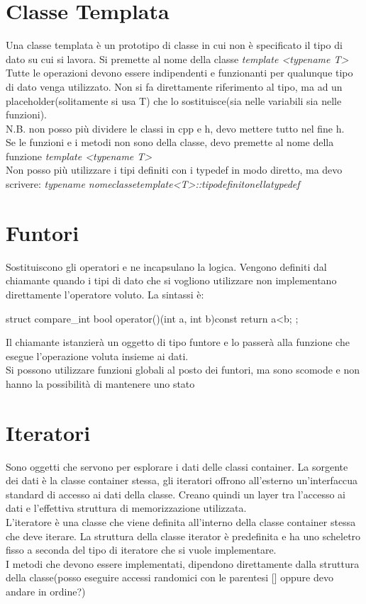 \section{Classe Templata}
Una classe templata è un prototipo di classe in cui non è specificato il tipo di dato su cui si lavora. Si premette al nome della classe \textit{template <typename T>}\\
Tutte le operazioni devono essere indipendenti e funzionanti per qualunque tipo di dato venga utilizzato. Non si fa direttamente riferimento al tipo, ma ad un placeholder(solitamente si usa T) che lo sostituisce(sia nelle variabili sia nelle funzioni).\\
N.B. non posso più dividere le classi in cpp e h, devo mettere tutto nel fine h.\\
Se le funzioni e i metodi non sono della classe, devo premette al nome della funzione \textit{template <typename T>}\\
Non posso più utilizzare i tipi definiti con i typedef in modo diretto, ma devo scrivere: \textit{typename nomeclassetemplate<T>::tipodefinitonellatypedef}

\section{Funtori}
Sostituiscono gli operatori e ne incapsulano la logica. Vengono definiti dal chiamante quando i tipi di dato che si vogliono utilizzare non implementano direttamente l'operatore voluto. La sintassi è:

\begin{cpp}
struct compare_int{
	bool operator()(int a, int b)const{
		return a<b;
	}
};
\end{cpp}

Il chiamante istanzierà un oggetto di tipo funtore e lo passerà alla funzione che esegue l'operazione voluta insieme ai dati.\\
Si possono utilizzare funzioni globali al posto dei funtori, ma sono scomode e non hanno la possibilità di mantenere uno stato

\section{Iteratori}
Sono oggetti che servono per esplorare i dati delle classi container. La sorgente dei dati è la classe container stessa, gli iteratori offrono all'esterno un'interfaccua standard di accesso ai dati della classe. Creano quindi un layer tra l'accesso ai dati e l'effettiva struttura di memorizzazione utilizzata.\\
L'iteratore è una classe che viene definita all'interno della classe container stessa che deve iterare. La struttura della classe iterator è predefinita e ha uno scheletro fisso a seconda del tipo di iteratore che si vuole implementare.\\
I metodi che devono essere implementati, dipendono direttamente dalla struttura della classe(posso eseguire accessi randomici con le parentesi [] oppure devo andare in ordine?)\\

